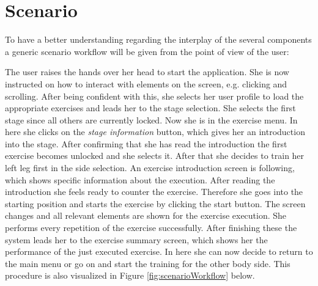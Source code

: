 \section{Scenario}\label{4_6_scenario}
To have a better understanding regarding the interplay of the several components a generic scenario workflow will be given from the point of view of the user:

The user raises the hands over her head to start the application. She is now instructed on how to interact with elements on  the screen, e.g. clicking and scrolling. After being confident with this, she selects her user profile to load the appropriate exercises and leads her to the stage selection. She selects the first stage since all others are currently locked. Now she is in the exercise menu. In here she clicks on the \textit{stage information} button, which gives her an introduction into the stage. After confirming that she has read the introduction the first exercise becomes unlocked and she selects it. After that she decides to train her left leg first in the side selection. An exercise introduction screen is following, which shows specific information about the execution. After reading the introduction she feels ready to counter the exercise. Therefore she goes into the starting position and starts the exercise by clicking the start button. The screen changes and all relevant elements are shown for the exercise execution. She performs every repetition of the exercise successfully. After finishing these the system leads her to the exercise summary screen, which shows her the performance of the just executed exercise. In here she can now decide to return to the main menu or go on and start the training for the other body side. This procedure is also visualized in Figure \ref{fig:scenarioWorkflow} below.
